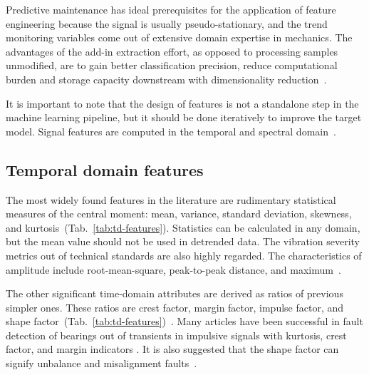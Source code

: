 Predictive maintenance has ideal prerequisites for the application of feature engineering because the signal is usually pseudo-stationary, and the trend monitoring variables come out of extensive domain expertise in mechanics. The advantages of the add-in extraction effort, as opposed to processing samples unmodified, are to gain better classification precision, reduce computational burden and storage capacity downstream with dimensionality reduction~\cite{johnson_feature_2019}. 

It is important to note that the design of features is not a standalone step in the machine learning pipeline, but it should be done iteratively to improve the target model. Signal features are computed in the temporal and spectral domain~\cite{brito_fault_2021}.

\subsection{Temporal domain features}
The most widely found features in the literature are rudimentary statistical measures of the central moment: mean, variance, standard deviation, skewness, and kurtosis~(Tab.~\ref{tab:td-features}). Statistics can be calculated in any domain, but the mean value should not be used in detrended data. The vibration severity metrics out of technical standards are also highly regarded. The characteristics of amplitude include root-mean-square, peak-to-peak distance, and maximum~\cite{mostafavi_novel_2021}.

The other significant time-domain attributes are derived as ratios of previous simpler ones. These ratios are crest factor, margin factor, impulse factor, and shape factor~(Tab.~\ref{tab:td-features})~\cite{nandi_condition_2019}. Many articles have been successful in fault detection of bearings out of transients in impulsive signals with kurtosis, crest factor, and margin indicators \cite{brito_fault_2021}. It is also suggested that the shape factor can signify unbalance and misalignment faults~\cite{nandi_condition_2019}.

